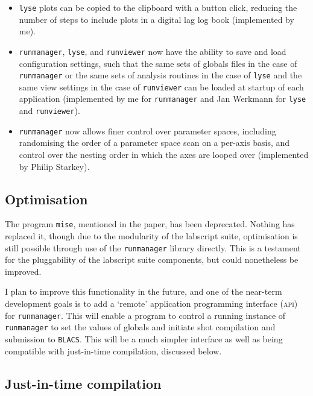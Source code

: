 \begin{itemize}
    \item \texttt{lyse} plots can be copied to the clipboard with a button click, reducing the number of steps to include plots in a digital lag log book (implemented by me).
    
    \item \texttt{runmanager}, \texttt{lyse}, and \texttt{runviewer} now have the ability to save and load configuration settings, such that the same sets of globals files in the case of \texttt{runmanager} or the same sets of analysis routines in the case of \texttt{lyse} and the same view settings in the case of \texttt{runviewer} can be loaded at startup of each application (implemented by me for \texttt{runmanager} and Jan Werkmann for \texttt{lyse} and \texttt{runviewer}).
    
    \item \texttt{runmanager} now allows finer control over parameter spaces, including randomising the order of a parameter space scan on a per-axis basis, and control over the nesting order in which the axes are looped over (implemented by Philip Starkey).
\end{itemize}

\subsection{Optimisation}

The program \texttt{mise}, mentioned in the paper, has been deprecated. Nothing has replaced it, though due to the modularity of the labscript suite, optimisation is still possible through use of the \texttt{runmanager} library directly. This is a testament for the pluggability of the labscript suite components, but could nonetheless be improved.

I plan to improve this functionality in the future, and one of the near-term development goals is to add a `remote' application programming interface (\textsc{api}) for \texttt{runmanager}. This will enable a program to control a running instance of \texttt{runmanager} to set the values of globals and initiate shot compilation and submission to \texttt{BLACS}. This will be a much simpler interface as well as being compatible with just-in-time compilation, discussed below.

\subsection{Just-in-time compilation}\label{sec:jit}

